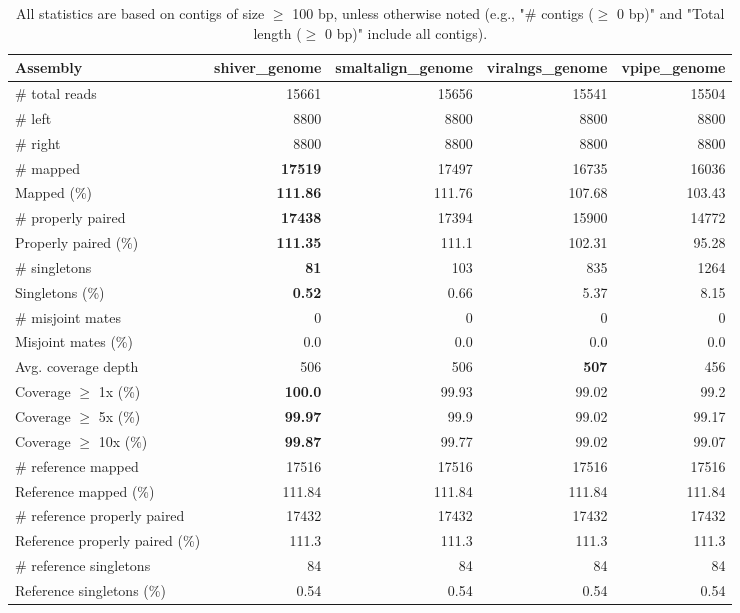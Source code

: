 \documentclass[12pt,a4paper]{article}
\begin{document}
\begin{table}[ht]
\begin{center}
\caption{All statistics are based on contigs of size $\geq$ 100 bp, unless otherwise noted (e.g., "\# contigs ($\geq$ 0 bp)" and "Total length ($\geq$ 0 bp)" include all contigs).}
\begin{tabular}{|l*{4}{|r}|}
\hline
Assembly & shiver\_genome & smaltalign\_genome & viralngs\_genome & vpipe\_genome \\ \hline
\# total reads & 15661 & 15656 & 15541 & 15504 \\ \hline
\# left & 8800 & 8800 & 8800 & 8800 \\ \hline
\# right & 8800 & 8800 & 8800 & 8800 \\ \hline
\# mapped & {\bf 17519} & 17497 & 16735 & 16036 \\ \hline
Mapped (\%) & {\bf 111.86} & 111.76 & 107.68 & 103.43 \\ \hline
\# properly paired & {\bf 17438} & 17394 & 15900 & 14772 \\ \hline
Properly paired (\%) & {\bf 111.35} & 111.1 & 102.31 & 95.28 \\ \hline
\# singletons & {\bf 81} & 103 & 835 & 1264 \\ \hline
Singletons (\%) & {\bf 0.52} & 0.66 & 5.37 & 8.15 \\ \hline
\# misjoint mates & 0 & 0 & 0 & 0 \\ \hline
Misjoint mates (\%) & 0.0 & 0.0 & 0.0 & 0.0 \\ \hline
Avg. coverage depth & 506 & 506 & {\bf 507} & 456 \\ \hline
Coverage $\geq$ 1x (\%) & {\bf 100.0} & 99.93 & 99.02 & 99.2 \\ \hline
Coverage $\geq$ 5x (\%) & {\bf 99.97} & 99.9 & 99.02 & 99.17 \\ \hline
Coverage $\geq$ 10x (\%) & {\bf 99.87} & 99.77 & 99.02 & 99.07 \\ \hline
\# reference mapped & 17516 & 17516 & 17516 & 17516 \\ \hline
Reference mapped (\%) & 111.84 & 111.84 & 111.84 & 111.84 \\ \hline
\# reference properly paired & 17432 & 17432 & 17432 & 17432 \\ \hline
Reference properly paired (\%) & 111.3 & 111.3 & 111.3 & 111.3 \\ \hline
\# reference singletons & 84 & 84 & 84 & 84 \\ \hline
Reference singletons (\%) & 0.54 & 0.54 & 0.54 & 0.54 \\ \hline

\end{tabular}
\end{center}
\end{table}
\end{document}
